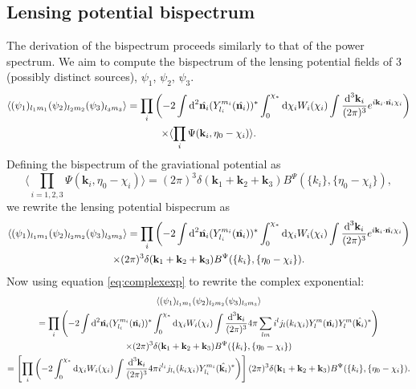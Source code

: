 \documentclass[11pt]{article} %
\DeclareRobustCommand{\d}{\ifmmode\text{d}\else d\fi}
\newcommand{\br}[1]{\ensuremath{\left( #1 \right)}}
\newcommand{\sbr}[1]{\ensuremath{\left[ #1 \right]}}
\begin{document}
\subsection{Lensing potential bispectrum}
The derivation of the bispectrum proceeds similarly to that of the power spectrum. We aim to compute the bispectrum of the lensing potential fields of 3 (possibly distinct sources), $\psi_1$, $\psi_2$, $\psi_3$. 
\begin{gather*}
    \langle (\psi_1)_{l_1m_1}(\psi_2)_{l_2m_2}(\psi_3)_{l_3m_3} \rangle = 
    \prod_i\br{-2\int\d^2\hat{\mathbf n_i}(Y^{m_i}_{l_i}(\hat{\mathbf n_i}))^*\int_0^{\chi_*}\d\chi_i W_i(\chi_i)\int\frac{\d^3\mathbf k_i}{(2\pi)^{3}}e^{i\mathbf k_i \cdot\hat{\mathbf n_i}\chi_i}} \\
    \times \langle \prod_i\Psi(\mathbf k_i, \eta_0 - \chi_i) \rangle.
\end{gather*}
Defining the bispectrum of the graviational potential as
\begin{equation*}
    \langle \prod_{i=1,2,3}\Psi(\mathbf k_i, \eta_0 - \chi_i) \rangle = (2\pi)^3\delta(\mathbf k_1 + \mathbf k_2 + \mathbf k_3)B^\Psi(\{k_i\}, \{\eta_0-\chi_i\}),
\end{equation*}
we rewrite the lensing potential bispecrum as
\begin{gather*}
    \langle (\psi_1)_{l_1m_1}(\psi_2)_{l_2m_2}(\psi_3)_{l_3m_3} \rangle = 
    \prod_i\br{-2\int\d^2\hat{\mathbf n_i}(Y^{m_i}_{l_i}(\hat{\mathbf n_i}))^*\int_0^{\chi_*}\d\chi_i W_i(\chi_i)\int\frac{\d^3\mathbf k_i}{(2\pi)^{3}}e^{i\mathbf k_i \cdot\hat{\mathbf n_i}\chi_i}}\\ \times (2\pi)^3\delta(\mathbf k_1 + \mathbf k_2 + \mathbf k_3)B^\Psi(\{k_i\}, \{\eta_0-\chi_i\}).
\end{gather*}
Now using equation \ref{eq:complexexp} to rewrite the complex exponential:
\begin{gather*}
    \langle (\psi_1)_{l_1m_1}(\psi_2)_{l_2m_2}(\psi_3)_{l_3m_3} \rangle \\ = 
    \prod_i\br{-2\int\d^2\hat{\mathbf n_i}(Y^{m_i}_{l_i}(\hat{\mathbf n_i}))^*\int_0^{\chi_*}\d\chi_i W_i(\chi_i)\int\frac{\d^3\mathbf k_i}{(2\pi)^{3}}4\pi\sum_{lm}i^{l}j_{l}(k_i\chi_i)Y_{l}^{m}(\hat{\mathbf n_i})Y_{l}^{m}(\hat{\mathbf k_i})^*}\\
    \times (2\pi)^3\delta(\mathbf k_1 + \mathbf k_2 + \mathbf k_3)B^\Psi(\{k_i\}, \{\eta_0-\chi_i\}) \\
    = \sbr{\prod_i\br{-2\int_0^{\chi_*}\d\chi_i W_i(\chi_i)\int\frac{\d^3\mathbf k_i}{(2\pi)^{3}}4\pi i^{l_i}j_{l_i}(k_i\chi_i)Y_{l_i}^{m_i}(\hat{\mathbf k_i})^*}} (2\pi)^3\delta(\mathbf k_1 + \mathbf k_2 + \mathbf k_3)B^\Psi(\{k_i\}, \{\eta_0-\chi_i\}).
\end{gather*}
\end{document}

